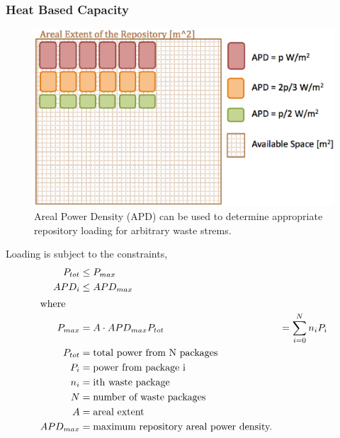 \begin{frame}[ctb!]
  \frametitle{Heat Based Capacity}
  \begin{minipage}{0.49\textwidth}
    \begin{figure}[h!]
        \includegraphics[width=\textheight]{APD.eps}
      \caption{Areal Power Density (APD) can be used to determine appropriate 
      repository loading for arbitrary waste strems.  }
      \label{fig:apd}
  \end{figure}
  \end{minipage}
  \hspace{0.01cm}
  \begin{minipage}{.49\textwidth}
    Loading is subject to the constraints,
    \begin{align}
      P_{tot} &\le P_{max} \\
      APD_i &\le APD_{max}\\
      \label{APD}
      \intertext{where}
      P_{max} &= A\cdot APD_{max} 
      P_{tot} &= \sum_{i=0}^{N}n_i P_i\\ 
      P_{tot} &= \mbox{total power from N packages}\nonumber\\
      P_i &= \mbox{power from package i}\nonumber\\
      n_i &= \mbox{ith waste package}\nonumber\\
      N &= \mbox{number of waste packages}\nonumber\\
      A &= \mbox{areal extent}\nonumber\\ 
      APD_{max} &= \mbox{maximum repository areal power density.}\nonumber
    \end{align}
  \end{minipage}

  
\end{frame}

